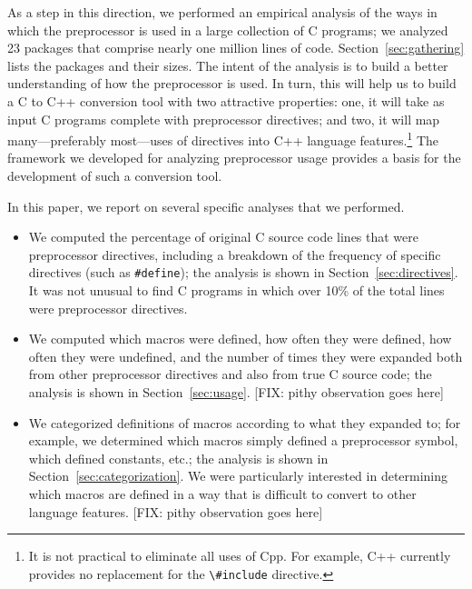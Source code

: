 As a step in this direction, we performed an empirical analysis of the
ways in which the preprocessor is used in a large collection of C
programs; we analyzed 23 packages that comprise nearly one
million lines of code.  Section~\ref{sec:gathering} lists the packages
and their sizes.  The intent of the analysis is to build a better
understanding of how the preprocessor is used.  In turn, this will
help us to build a C to C++ conversion tool with two attractive
properties: one, it will take as input C programs complete with
preprocessor directives; and two, it will map many---preferably
most---uses of directives into C++ language features.\footnote{It is
not practical to eliminate all uses of Cpp.  For example, C++
currently provides no replacement for the \verb+\#include+ directive.}
The framework we developed for analyzing preprocessor usage provides a
basis for the development of such a conversion tool.

In this paper, we report on several specific analyses that we
performed.  
\begin{itemize}

\item We computed the percentage of original C source code lines that
were preprocessor directives, including a breakdown of the frequency
of specific directives (such as \verb+#define+); the analysis is shown
in Section~\ref{sec:directives}. It was not unusual to find C programs
in which over 10\% of the total lines were preprocessor directives.

\item We computed which macros were defined, how often they were
defined, how often they were undefined, and the number of times they
were expanded both from other preprocessor directives and also from
true C source code; the analysis is shown in Section~\ref{sec:usage}.
[FIX: pithy observation goes here]

\item We categorized definitions of macros according to what they
      expanded to; for example, we determined which macros simply
      defined a preprocessor symbol, which defined constants, etc.;
      the analysis is shown in Section~\ref{sec:categorization}.  We
      were particularly interested in determining which macros are
      defined in a way that is difficult to convert to other language
      features.  [FIX: pithy observation goes here]

\end{itemize}

